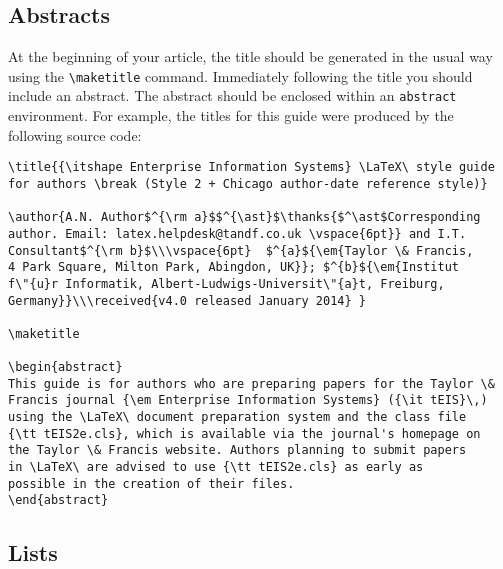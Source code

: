 \documentclass[]{tEIS2e}
\theoremstyle{plain}
\theoremstyle{remark}
\begin{document}
\subsection{Abstracts}

At the beginning of your article, the title should be generated in the usual way using the {\verb"\maketitle"}
command. Immediately following the title you should include an abstract. The abstract should be enclosed within
an {\tt abstract} environment. For example, the titles for this guide were produced by the following source code:
%
\begin{verbatim}
\title{{\itshape Enterprise Information Systems} \LaTeX\ style guide
for authors \break (Style 2 + Chicago author-date reference style)}

\author{A.N. Author$^{\rm a}$$^{\ast}$\thanks{$^\ast$Corresponding
author. Email: latex.helpdesk@tandf.co.uk \vspace{6pt}} and I.T.
Consultant$^{\rm b}$\\\vspace{6pt}  $^{a}${\em{Taylor \& Francis,
4 Park Square, Milton Park, Abingdon, UK}}; $^{b}${\em{Institut
f\"{u}r Informatik, Albert-Ludwigs-Universit\"{a}t, Freiburg,
Germany}}\\\received{v4.0 released January 2014} }

\maketitle

\begin{abstract}
This guide is for authors who are preparing papers for the Taylor \&
Francis journal {\em Enterprise Information Systems} ({\it tEIS}\,)
using the \LaTeX\ document preparation system and the class file
{\tt tEIS2e.cls}, which is available via the journal's homepage on
the Taylor \& Francis website. Authors planning to submit papers
in \LaTeX\ are advised to use {\tt tEIS2e.cls} as early as
possible in the creation of their files.
\end{abstract}
\end{verbatim}


\subsection{Lists}
\end{document}
